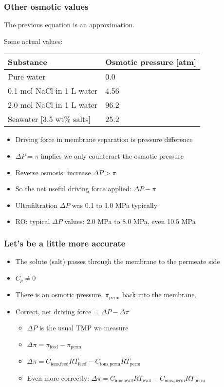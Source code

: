 \begin{frame}\frametitle{Other osmotic values}
	The previous equation is an approximation. 
	
	\vspace{12pt}
	Some actual values:
	\begin{tabular}{ll}\\ \hline
	 	\textbf{Substance}  		& \textbf{Osmotic pressure [atm]} \\ \hline
		Pure water					& 0.0\\
		0.1 mol NaCl in 1 L water 	& 4.56\\
		2.0 mol NaCl in 1 L water	& 96.2\\
		Seawater [3.5 wt\% salts]	& 25.2\\
	\end{tabular}
	
	\begin{itemize}
		\item	Driving force in membrane separation is pressure difference
		\item	$\Delta P = \pi$ implies we only counteract the osmotic pressure
		\item	Reverse osmosis: increase $\Delta P > \pi$
		\item	So the net useful driving force applied: $\Delta P - \pi$
		\item	Ultrafiltration $\Delta P$ was 0.1 to 1.0 MPa typically
		\item	RO: typical $\Delta P$ values: 2.0 MPa to 8.0 MPa, even 10.5 MPa  %
	\end{itemize}	
\end{frame}

\begin{frame}\frametitle{Let's be a little more accurate}
	\begin{itemize}
		\item	The solute (salt) passes through the membrane to the permeate side
		\item	$C_p \neq 0$
		\item	There is an osmotic pressure, $\pi_\text{perm}$ back into the membrane.
		\item	Correct, net driving force = $\Delta P - \Delta \pi$
		\begin{itemize}
			\item	$\Delta P$ is the usual TMP we measure
			\item	$\Delta \pi = \pi_\text{feed} - \pi_\text{perm}$ 
			\item	$\Delta \pi = C_\text{ions,feed}RT_\text{feed} - C_\text{ions,perm}RT_\text{perm}$ 
			\item	Even more correctly: $\Delta \pi = C_\text{ions,wall}RT_\text{wall} - C_\text{ions,perm}RT_\text{perm}$ 
		\end{itemize}
	\end{itemize}
\end{frame}

